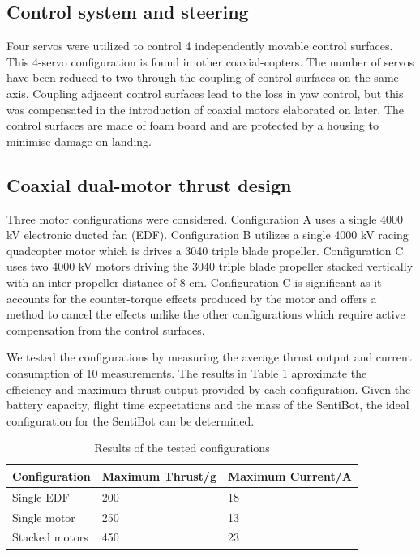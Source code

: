 \documentclass[12pt]{article}
\begin{document}
\subsection{Control system and steering}

Four servos were utilized to control 4 independently movable control surfaces. This 4-servo configuration is found in other coaxial-copters\cite{SFV}. The number of servos have been reduced to two through the coupling of control surfaces on the same axis. Coupling adjacent control surfaces lead to the loss in yaw control, but this was compensated in the introduction of coaxial motors elaborated on later. The control surfaces are made of foam board and are protected by a housing to minimise damage on landing. 

\subsection{Coaxial dual-motor thrust design}

Three motor configurations were considered. Configuration A uses a single 4000 kV electronic ducted fan (EDF).  Configuration B utilizes a single 4000 kV racing quadcopter motor which is drives a 3040 triple blade propeller. Configuration C uses two 4000 kV motors driving the 3040 triple blade propeller stacked vertically with an inter-propeller distance of 8 cm. Configuration C is significant as it accounts for the counter-torque effects produced by the motor and offers a method to cancel the effects unlike the other configurations which require active compensation from the control surfaces.

We tested the configurations by measuring the average thrust output and current consumption of 10 measurements. The results in Table \ref{tab:configs} aproximate the efficiency and maximum thrust output provided by each configuration. Given the battery capacity, flight time expectations and the mass of the SentiBot, the ideal configuration for the SentiBot can be determined.

\begin{table}[h]
	\centering
	\begin{tabular}{ | l | l | l | }
		Configuration & Maximum Thrust/g & Maximum Current/A \\
		\hline
		Single EDF & 200 & 18 \\
		Single motor & 250 & 13 \\
		Stacked motors & 450 & 23 \\
	\end{tabular}
	\caption{Results of the tested configurations}
	\label{tab:configs}
\end{table}
\end{document}
